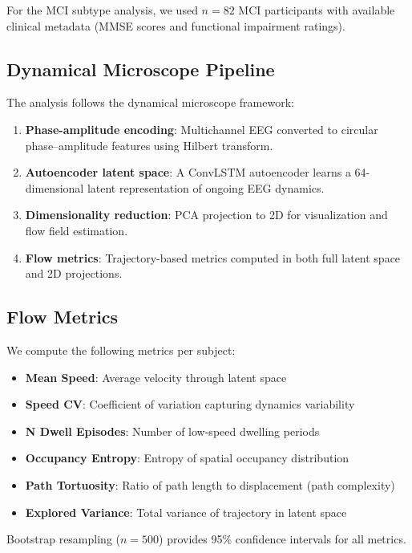 \documentclass[5p,twocolumn,authoryear]{elsarticle}
\begin{document}
For the MCI subtype analysis, we used $n = 82$ MCI participants with available clinical metadata (MMSE scores and functional impairment ratings).

\subsection{Dynamical Microscope Pipeline}

The analysis follows the dynamical microscope framework:
\begin{enumerate}
    \item \textbf{Phase-amplitude encoding}: Multichannel EEG converted to circular phase--amplitude features using Hilbert transform.
    \item \textbf{Autoencoder latent space}: A ConvLSTM autoencoder learns a 64-dimensional latent representation of ongoing EEG dynamics.
    \item \textbf{Dimensionality reduction}: PCA projection to 2D for visualization and flow field estimation.
    \item \textbf{Flow metrics}: Trajectory-based metrics computed in both full latent space and 2D projections.
\end{enumerate}

\subsection{Flow Metrics}

We compute the following metrics per subject:
\begin{itemize}
    \item \textbf{Mean Speed}: Average velocity through latent space
    \item \textbf{Speed CV}: Coefficient of variation capturing dynamics variability
    \item \textbf{N Dwell Episodes}: Number of low-speed dwelling periods
    \item \textbf{Occupancy Entropy}: Entropy of spatial occupancy distribution
    \item \textbf{Path Tortuosity}: Ratio of path length to displacement (path complexity)
    \item \textbf{Explored Variance}: Total variance of trajectory in latent space
\end{itemize}

Bootstrap resampling ($n = 500$) provides 95\% confidence intervals for all metrics.

\end{document}
